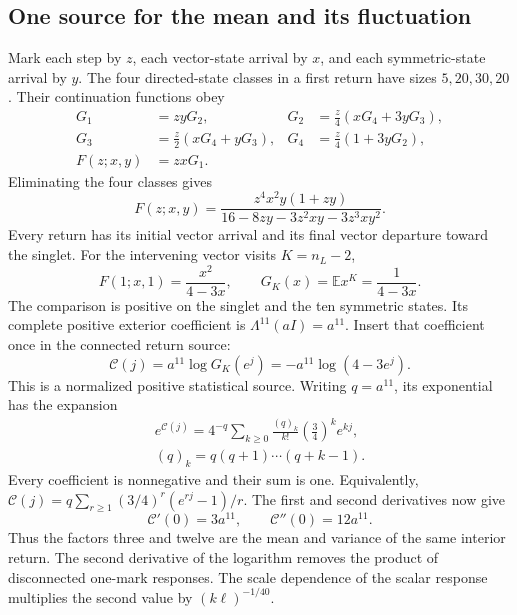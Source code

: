 \documentclass[aps,prx,reprint,longbibliography]{revtex4-2}
\providecommand{\E}{\mathbb E}
\begin{document}
\subsection{One source for the mean and its fluctuation}
\label{app:three-twelve}

Mark each step by $z$, each vector-state arrival by $x$, and each symmetric-state arrival by $y$. The four directed-state classes in a first return have sizes $5,20,30,20$. Their continuation functions obey
\begin{equation}
 \begin{aligned}
 G_1&=zyG_2,&G_2&=\tfrac z4(xG_4+3yG_3),\\
 G_3&=\tfrac z2(xG_4+yG_3),&G_4&=\tfrac z4(1+3yG_2),\\
 F(z;x,y)&=zxG_1.&&
 \end{aligned}
 \label{ap:marked-return-system}
\end{equation}
Eliminating the four classes gives
\begin{equation}
 F(z;x,y)=\frac{z^4x^2y(1+zy)}{16-8zy-3z^2xy-3z^3xy^2}.
 \label{ap:marked-return}
\end{equation}
Every return has its initial vector arrival and its final vector departure toward the singlet. For the intervening vector visits $K=n_L-2$,
\begin{equation}
 F(1;x,1)=\frac{x^2}{4-3x},\qquad
 G_K(x)=\E x^K=\frac1{4-3x}.
 \label{ap:interior-return}
\end{equation}
The comparison is positive on the singlet and the ten symmetric states. Its complete positive exterior coefficient is $\Lambda^{11}(aI)=a^{11}$. Insert that coefficient once in the connected return source:
\begin{equation}
 \mathcal C(j)=a^{11}\log G_K(e^j)
 =-a^{11}\log(4-3e^j).
 \label{ap:stationary-source}
\end{equation}
This is a normalized positive statistical source. Writing $q=a^{11}$, its exponential has the expansion
\begin{equation}
 \begin{gathered}
 e^{\mathcal C(j)}=4^{-q}\sum_{k\geq0}
 \frac{(q)_k}{k!}\left(\frac34\right)^k e^{kj},\\
 (q)_k=q(q+1)\cdots(q+k-1).
 \end{gathered}
 \label{ap:positive-stationary-source}
\end{equation}
Every coefficient is nonnegative and their sum is one. Equivalently, $\mathcal C(j)=q\sum_{r\geq1}(3/4)^r(e^{rj}-1)/r$.
The first and second derivatives now give
\begin{equation}
 \mathcal C'(0)=3a^{11},\qquad
 \mathcal C''(0)=12a^{11}.
 \label{ap:three-twelve}
\end{equation}
Thus the factors three and twelve are the mean and variance of the same interior return. The second derivative of the logarithm removes the product of disconnected one-mark responses. The scale dependence of the scalar response multiplies the second value by $(k\ell)^{-1/40}$.
\end{document}
